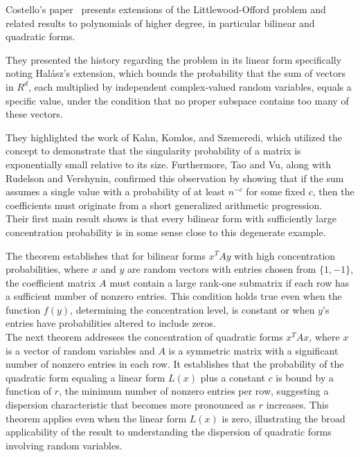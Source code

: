Costello's paper~\cite{costello2009bilinear} presents extensions of the Littlewood-Offord problem and related results to polynomials of higher degree, in particular bilinear and quadratic forms.

They presented the history regarding the problem in its linear form specifically noting Halász's extension, which bounds the probability that the sum of vectors in \(R^d\), each multiplied by independent complex-valued random variables, equals a specific value, under the condition that no proper subspace contains too many of these vectors.

They highlighted the work of Kahn, Komlos, and Szemeredi, which utilized the concept to demonstrate that the singularity probability of a matrix is exponentially small relative to its size. Furthermore, Tao and Vu, along with Rudelson and Vershynin, confirmed this observation by showing that if the sum assumes a single value with a probability of at least \(n^{-c}\) for some fixed \(c\), then the coefficients must originate from a short generalized arithmetic progression.\\

Their first main result shows is that every bilinear form with sufficiently large concentration probability is in some sense close to this degenerate example.

The theorem establishes that for bilinear forms \(x^T A y\) with high concentration probabilities, where \(x\) and \(y\) are random vectors with entries chosen from \(\{1, -1\}\), the coefficient matrix \(A\) must contain a large rank-one submatrix if each row has a sufficient number of nonzero entries. This condition holds true even when the function \(f(y)\), determining the concentration level, is constant or when \(y\)'s entries have probabilities altered to include zeros.\\

The next theorem addresses the concentration of quadratic forms \(x^T A x\), where \(x\) is a vector of random variables and \(A\) is a symmetric matrix with a significant number of nonzero entries in each row. It establishes that the probability of the quadratic form equaling a linear form \(L(x)\) plus a constant \(c\) is bound by a function of \(r\), the minimum number of nonzero entries per row, suggesting a dispersion characteristic that becomes more pronounced as \(r\) increases. This theorem applies even when the linear form \(L(x)\) is zero, illustrating the broad applicability of the result to understanding the dispersion of quadratic forms involving random variables.
